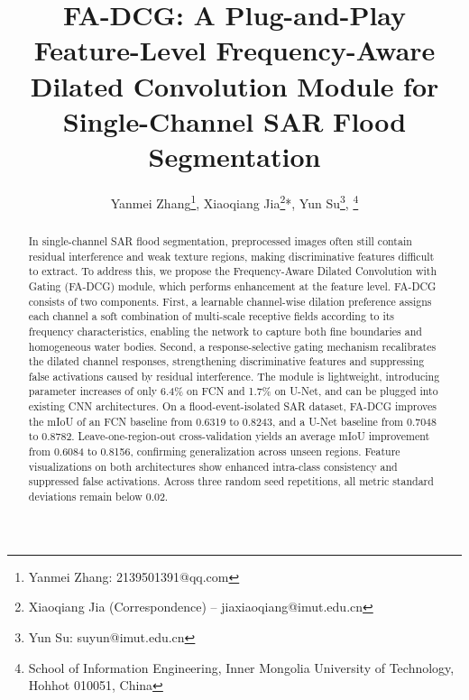 \documentclass[lettersize,journal]{IEEEtran}
\begin{document}
\title{FA-DCG: A Plug-and-Play Feature-Level Frequency-Aware Dilated Convolution Module for Single-Channel SAR Flood Segmentation}







\author{
    Yanmei Zhang\thanks{Yanmei Zhang: 2139501391@qq.com},
    Xiaoqiang Jia\thanks{Xiaoqiang Jia (Correspondence) -- jiaxiaoqiang@imut.edu.cn}*,
    Yun Su\thanks{Yun Su: suyun@imut.edu.cn},
\thanks{School of Information Engineering, Inner Mongolia University of Technology, Hohhot 010051, China}}

\maketitle

\begin{abstract}
In single-channel SAR flood segmentation, preprocessed images often still contain residual interference and weak texture regions, making discriminative features difficult to extract. To address this, we propose the Frequency-Aware Dilated Convolution with Gating (FA-DCG) module, which performs enhancement at the feature level. FA-DCG consists of two components. First, a learnable channel-wise dilation preference assigns each channel a soft combination of multi-scale receptive fields according to its frequency characteristics, enabling the network to capture both fine boundaries and homogeneous water bodies. Second, a response-selective gating mechanism recalibrates the dilated channel responses, strengthening discriminative features and suppressing false activations caused by residual interference. The module is lightweight, introducing parameter increases of only 6.4\% on FCN and 1.7\% on U-Net, and can be plugged into existing CNN architectures. On a flood-event-isolated SAR dataset, FA-DCG improves the mIoU of an FCN baseline from 0.6319 to 0.8243, and a U-Net baseline from 0.7048 to 0.8782. Leave-one-region-out cross-validation yields an average mIoU improvement from 0.6084 to 0.8156, confirming generalization across unseen regions. Feature visualizations on both architectures show enhanced intra-class consistency and suppressed false activations. Across three random seed repetitions, all metric standard deviations remain below 0.02.
\end{abstract}
\end{document}
